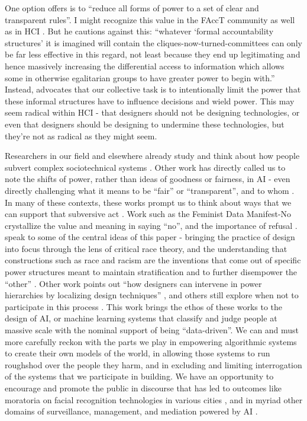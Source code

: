 \documentclass[manuscript,screen]{acmart}
\begin{document}
One option \citeauthor{graeber2015utopia} offers is to ``reduce all forms of power to a set of clear and transparent rules''.
I might recognize this value in the FAccT community as well as in HCI
\cite{Amershi:2019:GHI:3290605.3300233,10.1145/3290605.3300295,Eslami:2019:UAT:3290605.3300724,Jakesch:2019:ACP:3290605.3300469,Kocielnik:2019:YAI:3290605.3300641}.
But he cautions against this: ``whatever ‘formal accountability structures' it is imagined will contain the cliques-now-turned-committees can only be far less effective in this regard, not least because they end up legitimating and hence massively increasing the differential access to information which allows some in otherwise egalitarian groups to have greater power to begin with.'' Instead, \citeauthor{graeber2015utopia} advocates that our collective task is to intentionally limit the power that these informal structures have to influence decisions and wield power.
This may seem radical within HCI - that designers should not be designing technologies, or even that designers should be designing to undermine these technologies, but they're not as radical as they might seem.

Researchers in our field and elsewhere already study and think about how people subvert complex sociotechnical systems
\cite{uberAlgorithm,10.1145/3313831.3376424}.
Other work has directly called us to note the shifts of power, rather than ideas of goodness or fairness, in AI - even directly challenging what it means to be ``fair'' or ``transparent'', and to whom
\cite{kalluri2020don}.
In many of these contexts, these works prompt us to think about ways that we can support that subversive act
\cite{doi:10.1177/2053951717718855}.
Work such as the Feminist Data Manifest-No crystallize the value and meaning in saying ``no'', and the importance of refusal
\cite{feministManifestNo,d2020data}.
\citeauthor{10.1145/3313831.3376392} speak to some of the central ideas of this paper -
bringing the practice of design into focus through the lens of critical race theory, and the understanding that constructions such as race and racism are the inventions that come out of specific power structures meant to maintain stratification and to further disempower the ``other''
\cite{10.1145/3313831.3376392}.
Other work points out ``how designers can intervene in power hierarchies by localizing design techniques''
\cite{10.1145/3290605.3300791}, and others still explore when not to participate in this process
\cite{10.1145/1978942.1979275}.
This work brings the ethos of these works to the design of AI, or machine learning systems that classify and judge people at massive scale with the nominal support of being ``data-driven''.
We can and must more carefully reckon with the parts we play in empowering algorithmic systems to create their own models of the world, in allowing those systems to run roughshod over the people they harm, and in excluding and limiting interrogation of the systems that we participate in building.
We have an opportunity to encourage and promote the public in discourse that has led to outcomes like moratoria on facial recognition technologies in various cities \cite{10.1145/3313129}, and in myriad other domains of surveillance, management, and mediation powered by AI \cite{mattern2017city}.
\end{document}
